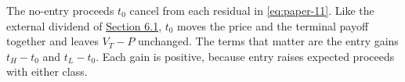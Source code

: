 
The no-entry proceeds \(t_0\) cancel from each residual in
\eqref{eq:paper-11}. Like the external dividend of
\hyperref[sec-access-to-prices]{Section 6.1}, \(t_0\) moves the price
and the terminal payoff together and leaves \(V_T-P\) unchanged. The
terms that matter are the entry gains \(t_H-t_0\) and \(t_L-t_0\).
Each gain is positive, because entry raises expected proceeds with
either class.
